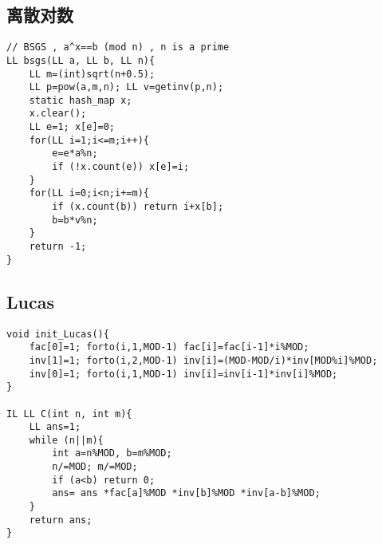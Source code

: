 \documentclass{article}
\begin{document}
\subsection{离散对数}
\begin{lstlisting}
// BSGS , a^x==b (mod n) , n is a prime
LL bsgs(LL a, LL b, LL n){
	LL m=(int)sqrt(n+0.5);
	LL p=pow(a,m,n); LL v=getinv(p,n);
	static hash_map x;
	x.clear();
	LL e=1; x[e]=0;
	for(LL i=1;i<=m;i++){
		e=e*a%n;
		if (!x.count(e)) x[e]=i;
	}
	for(LL i=0;i<n;i+=m){
		if (x.count(b)) return i+x[b];
		b=b*v%n;
	}
	return -1;
}
\end{lstlisting}

\subsection{Lucas}
\begin{lstlisting}
void init_Lucas(){
	fac[0]=1; forto(i,1,MOD-1) fac[i]=fac[i-1]*i%MOD;
	inv[1]=1; forto(i,2,MOD-1) inv[i]=(MOD-MOD/i)*inv[MOD%i]%MOD;
	inv[0]=1; forto(i,1,MOD-1) inv[i]=inv[i-1]*inv[i]%MOD;
}

IL LL C(int n, int m){
	LL ans=1;
	while (n||m){
		int a=n%MOD, b=m%MOD;
		n/=MOD; m/=MOD;
		if (a<b) return 0;
		ans= ans *fac[a]%MOD *inv[b]%MOD *inv[a-b]%MOD;
	}
	return ans;
}
\end{lstlisting}
\end{document}
